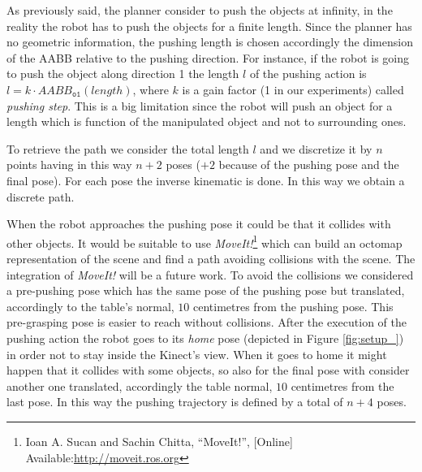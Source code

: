 As previously said, the planner consider to push the objects at infinity, in the reality the robot has to push the objects for a finite length. Since the planner has no geometric information, the pushing length is chosen accordingly the dimension of the AABB relative to the pushing direction. For instance, if the robot is going to push the object  along direction 1 the length $l$ of the pushing action is $l=k \cdot AABB_{\mathtt{o1}}(length)$, where $k$ is a gain factor (1 in our experiments) called \textit{pushing step}. This is a big limitation since the robot will push an object for a length which is function of the manipulated object and not to surrounding ones. 

To retrieve the path we consider the total length $l$ and we discretize it by $n$ points having in this way $n+2$ poses ($+2$ because of the pushing pose and the final pose). For each pose the inverse kinematic is done. In this way we obtain a discrete path. 

When the robot approaches the pushing pose it could be that it collides with other objects. It would be suitable to use \textit{MoveIt!}\footnote{Ioan A. Sucan and Sachin Chitta, “MoveIt!”, [Online] Available:\href{http://moveit.ros.org} {\url{http://moveit.ros.org}}} which can build an octomap representation of the scene and find a path avoiding collisions with the scene. The integration of \textit{MoveIt!} will be a future work. To avoid the collisions we considered a pre-pushing pose which has the same pose of the pushing pose but translated, accordingly to the table's normal, $10$ centimetres from the pushing pose. This pre-grasping pose is easier to reach without collisions. 
After the execution of the pushing action the robot goes to its \textit{home} pose (depicted in Figure \ref{fig:setup_}) in order not to stay inside the Kinect's view. When it goes to home it might happen that it collides with some objects, so also for the final pose with consider another one translated, accordingly the table normal, $10$ centimetres from the last pose. 
In this way the pushing trajectory is defined by a total of $n+4$ poses. 




